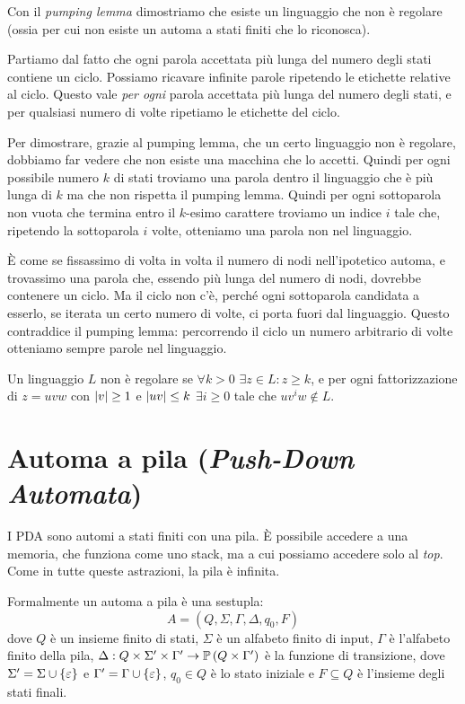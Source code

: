 Con il \emph{pumping lemma} dimostriamo che esiste un linguaggio che non \`e regolare (ossia per cui non esiste un automa a stati finiti che lo riconosca).

Partiamo dal fatto che ogni parola accettata pi\`u lunga del numero degli stati contiene un ciclo. 
Possiamo ricavare infinite parole ripetendo le etichette relative al ciclo.
Questo vale \emph{per ogni} parola accettata pi\`u lunga del numero degli stati, e per qualsiasi numero di volte ripetiamo le etichette del ciclo.

Per dimostrare, grazie al pumping lemma, che un certo linguaggio non \`e regolare, dobbiamo far vedere che non esiste una macchina che lo accetti.
Quindi per ogni possibile numero $k$ di stati troviamo una parola dentro il linguaggio che \`e pi\`u lunga di $k$ ma che non rispetta il pumping lemma.
Quindi per ogni sottoparola non vuota che termina entro il $k$-esimo carattere troviamo un indice $i$ tale che, ripetendo la sottoparola $i$ volte, otteniamo una parola non nel linguaggio.

\`E come se fissassimo di volta in volta il numero di nodi nell'ipotetico automa, e trovassimo una parola che, essendo pi\`u lunga del numero di nodi, dovrebbe contenere un ciclo.
Ma il ciclo non c'\`e, perch\'e ogni sottoparola candidata a esserlo, se iterata un certo numero di volte, ci porta fuori dal linguaggio.
Questo contraddice il pumping lemma: percorrendo il ciclo un numero arbitrario di volte otteniamo sempre parole nel linguaggio.

\begin{theorem}
	Un linguaggio $L$ non \`e regolare se $\forall k > 0$ $\exists z \in L : z \ge k$, e per ogni fattorizzazione di $z = u v w$ con $\left\lvert{v}\right\rvert \ge 1$ e $\left\lvert{uv}\right\rvert \le k$ $\exists i \ge 0$ tale che $u v^i w \notin L$.
\end{theorem}

\section{Automa a pila (\emph{Push-Down Automata})}

I PDA sono automi a stati finiti con una pila.
\`E possibile accedere a una memoria, che funziona come uno stack, ma a cui possiamo accedere solo al \emph{top}.
Come in tutte queste astrazioni, la pila \`e infinita.

Formalmente un automa a pila \`e una sestupla:
\[
A = ( Q, \Sigma, \Gamma, \Delta, q_0, F )
\]
dove $Q$ \`e un insieme finito di stati, $\Sigma$ \`e un alfabeto finito di input, $\Gamma$ \`e l'alfabeto finito della pila, $\Delta : Q \times \Sigma' \times \Gamma' \to \mathbb{P} \left( { Q \times \Gamma' } \right)$ \`e la funzione di transizione, dove $\Sigma' = \Sigma \cup \{ \varepsilon \}$ e $\Gamma' = \Gamma \cup \{ \varepsilon \}$, $q_0 \in Q$ \`e lo stato iniziale e $F \subseteq Q$ \`e l'insieme degli stati finali.

